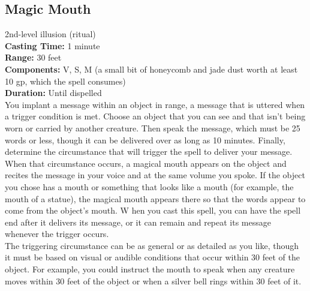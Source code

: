 \documentclass[11pt, A4paper, english]{article}
\begin{document}
		\subsection{Magic Mouth}
2nd-level illusion (ritual) \\
\textbf{Casting Time:} 1 minute \\
\textbf{Range:} 30 feet \\
\textbf{Components:} V, S, M (a small bit of honeycomb and jade dust worth at least 10 gp, which the spell consumes) \\
\textbf{Duration:} Until dispelled \\
You implant a message within an object in range, a message that is uttered when a trigger condition is met. Choose an object that you can see and that isn’t being worn or carried by another creature. Then speak the message, which must be 25 words or less, though it can be delivered over as long as 10 minutes. Finally, determine the circumstance that will trigger the spell to deliver your message. \\
When that circumstance occurs, a magical mouth appears on the object and recites the message in your voice and at the same volume you spoke. If the object you chose has a mouth or something that looks like a mouth (for example, the mouth of a statue), the magical mouth appears there so that the words appear to come from the object’s mouth. W hen you cast this spell, you can have the spell end after it delivers its message, or it can remain and repeat its message whenever the trigger occurs. \\
The triggering circumstance can be as general or as detailed as you like, though it must be based on visual or audible conditions that occur within 30 feet of the object. For example, you could instruct the mouth to speak when any creature moves within 30 feet of the object or when a silver bell rings within 30 feet of it.
\end{document}
